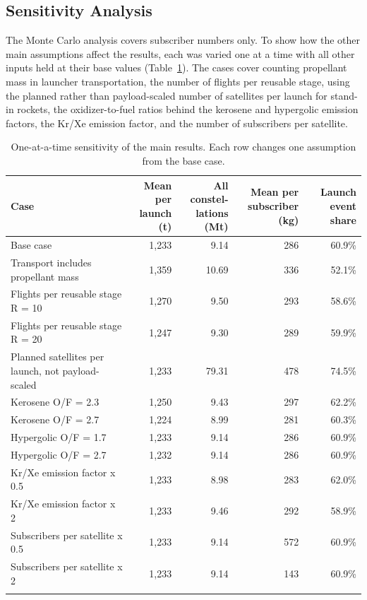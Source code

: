 \documentclass[pdflatex,sn-mathphys-num]{sn-jnl}
\theoremstyle{thmstyleone}%
\theoremstyle{thmstyletwo}%
\theoremstyle{thmstylethree}%
\begin{document}
\subsection{Sensitivity Analysis}\label{sec:sensitivity}
The Monte Carlo analysis covers subscriber numbers only. To show how the other main assumptions affect the results, each was varied one at a time with all other inputs held at their base values (Table~\ref{tab:sensitivity}). The cases cover counting propellant mass in launcher transportation, the number of flights per reusable stage, using the planned rather than payload-scaled number of satellites per launch for stand-in rockets, the oxidizer-to-fuel ratios behind the kerosene and hypergolic emission factors, the Kr/Xe emission factor, and the number of subscribers per satellite.

\begin{table}[h]
\caption{One-at-a-time sensitivity of the main results. Each row changes one assumption from the base case.}
\label{tab:sensitivity}
\begin{tabular}{@{}lrrrr@{}}
\toprule
Case & \makecell[r]{Mean per\\launch (t)} & \makecell[r]{All constel-\\lations (Mt)} & \makecell[r]{Mean per\\subscriber (kg)} & \makecell[r]{Launch event\\share} \\
\midrule
Base case & 1,233 & 9.14 & 286 & 60.9\% \\
Transport includes propellant mass & 1,359 & 10.69 & 336 & 52.1\% \\
Flights per reusable stage R = 10 & 1,270 & 9.50 & 293 & 58.6\% \\
Flights per reusable stage R = 20 & 1,247 & 9.30 & 289 & 59.9\% \\
Planned satellites per launch, not payload-scaled & 1,233 & 79.31 & 478 & 74.5\% \\
Kerosene O/F = 2.3 & 1,250 & 9.43 & 297 & 62.2\% \\
Kerosene O/F = 2.7 & 1,224 & 8.99 & 281 & 60.3\% \\
Hypergolic O/F = 1.7 & 1,233 & 9.14 & 286 & 60.9\% \\
Hypergolic O/F = 2.7 & 1,232 & 9.14 & 286 & 60.9\% \\
Kr/Xe emission factor x 0.5 & 1,233 & 8.98 & 283 & 62.0\% \\
Kr/Xe emission factor x 2 & 1,233 & 9.46 & 292 & 58.9\% \\
Subscribers per satellite x 0.5 & 1,233 & 9.14 & 572 & 60.9\% \\
Subscribers per satellite x 2 & 1,233 & 9.14 & 143 & 60.9\% \\
\botrule
\end{tabular}
\end{table}
\end{document}
